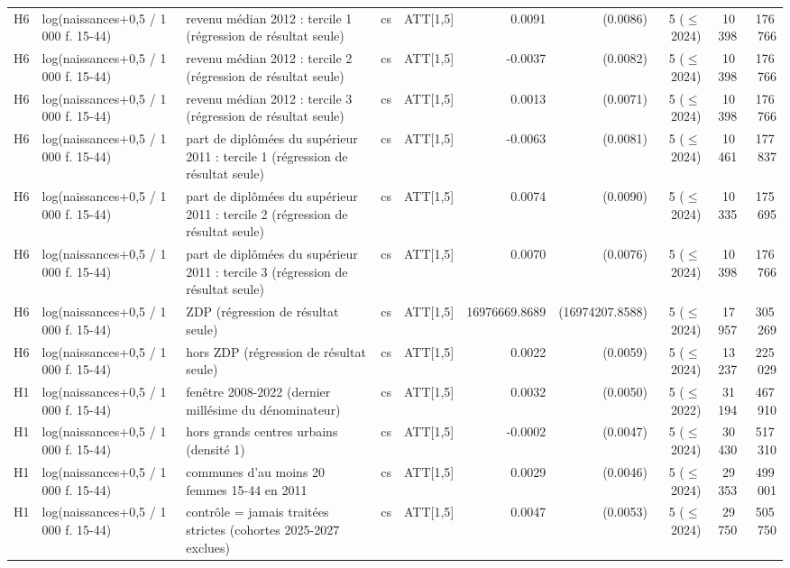 \begin{table}
\begin{threeparttable}
\begin{tabular}{lp{3.8cm}p{4.6cm}lp{3.5cm}rrrrr}
H6 & log(naissances+0,5 / 1 000 f. 15-44) & revenu médian 2012 : tercile 1 (régression de résultat seule) & cs & ATT[1,5] & 0.0091 & (0.0086) & 5 ($\leq$ 2024) & 10\,398 & 176\,766 \\
H6 & log(naissances+0,5 / 1 000 f. 15-44) & revenu médian 2012 : tercile 2 (régression de résultat seule) & cs & ATT[1,5] & -0.0037 & (0.0082) & 5 ($\leq$ 2024) & 10\,398 & 176\,766 \\
H6 & log(naissances+0,5 / 1 000 f. 15-44) & revenu médian 2012 : tercile 3 (régression de résultat seule) & cs & ATT[1,5] & 0.0013 & (0.0071) & 5 ($\leq$ 2024) & 10\,398 & 176\,766 \\
H6 & log(naissances+0,5 / 1 000 f. 15-44) & part de diplômées du supérieur 2011 : tercile 1 (régression de résultat seule) & cs & ATT[1,5] & -0.0063 & (0.0081) & 5 ($\leq$ 2024) & 10\,461 & 177\,837 \\
H6 & log(naissances+0,5 / 1 000 f. 15-44) & part de diplômées du supérieur 2011 : tercile 2 (régression de résultat seule) & cs & ATT[1,5] & 0.0074 & (0.0090) & 5 ($\leq$ 2024) & 10\,335 & 175\,695 \\
H6 & log(naissances+0,5 / 1 000 f. 15-44) & part de diplômées du supérieur 2011 : tercile 3 (régression de résultat seule) & cs & ATT[1,5] & 0.0070 & (0.0076) & 5 ($\leq$ 2024) & 10\,398 & 176\,766 \\
H6 & log(naissances+0,5 / 1 000 f. 15-44) & ZDP (régression de résultat seule) & cs & ATT[1,5] & 16976669.8689 & (16974207.8588) & 5 ($\leq$ 2024) & 17\,957 & 305\,269 \\
H6 & log(naissances+0,5 / 1 000 f. 15-44) & hors ZDP (régression de résultat seule) & cs & ATT[1,5] & 0.0022 & (0.0059) & 5 ($\leq$ 2024) & 13\,237 & 225\,029 \\
H1 & log(naissances+0,5 / 1 000 f. 15-44) & fenêtre 2008-2022 (dernier millésime du dénominateur) & cs & ATT[1,5] & 0.0032 & (0.0050) & 5 ($\leq$ 2022) & 31\,194 & 467\,910 \\
H1 & log(naissances+0,5 / 1 000 f. 15-44) & hors grands centres urbains (densité 1) & cs & ATT[1,5] & -0.0002 & (0.0047) & 5 ($\leq$ 2024) & 30\,430 & 517\,310 \\
H1 & log(naissances+0,5 / 1 000 f. 15-44) & communes d'au moins 20 femmes 15-44 en 2011 & cs & ATT[1,5] & 0.0029 & (0.0046) & 5 ($\leq$ 2024) & 29\,353 & 499\,001 \\
H1 & log(naissances+0,5 / 1 000 f. 15-44) & contrôle = jamais traitées strictes (cohortes 2025-2027 exclues) & cs & ATT[1,5] & 0.0047 & (0.0053) & 5 ($\leq$ 2024) & 29\,750 & 505\,750 \\

\end{tabular}
\end{threeparttable}
\end{table}
